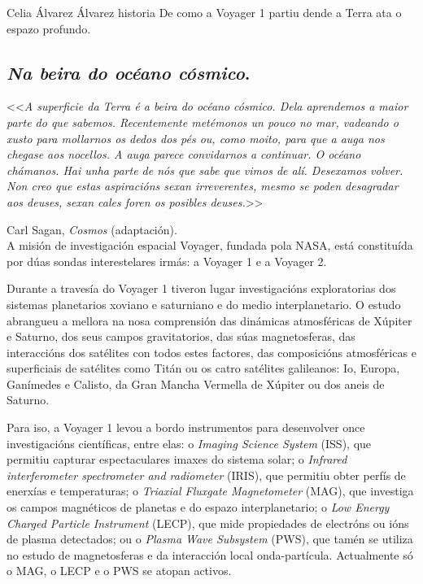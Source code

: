\Titular*%
{Viaxeiros espaciais. Oda á Voyager 1}%
{Celia Álvarez Álvarez}%
{historia}%
{De como a Voyager 1 partiu dende a Terra ata o espazo profundo.}%

\begin{refsection}
\begin{multicols}{2}

\subsection*{\textit{Na beira do océano cósmico}.}

<<\textit{A superficie da Terra é a beira do océano cósmico. Dela aprendemos a
maior parte do que sabemos. Recentemente metémonos un pouco no mar, vadeando o
xusto para mollarnos os dedos dos pés ou, como moito, para que a auga nos
chegase aos nocellos. A auga parece convidarnos a continuar. O océano chámanos.
Hai unha parte de nós que sabe que vimos de alí. Desexamos volver. Non creo que
estas aspiracións sexan irreverentes, mesmo se poden desagradar aos deuses,
sexan cales foren os posibles deuses.}>> 

\hfill Carl Sagan, \textit{Cosmos} (adaptación). \\

A misión de investigación espacial Voyager, fundada pola NASA, está constituída
por dúas sondas interestelares irmás: a Voyager 1 e a Voyager 2.

Durante a travesía do Voyager 1 tiveron lugar investigacións exploratorias dos
sistemas planetarios xoviano e saturniano e do medio interplanetario. O estudo
abrangueu a mellora na nosa comprensión das dinámicas atmosféricas de Xúpiter e
Saturno, dos seus campos gravitatorios, das súas magnetosferas, das
interaccións dos satélites con todos estes factores, das composicións
atmosféricas e superficiais de satélites como Titán ou os catro satélites
galileanos: Io, Europa, Ganímedes e Calisto, da Gran Mancha Vermella de Xúpiter
ou dos aneis de Saturno.

Para iso, a Voyager 1 levou a bordo instrumentos para desenvolver once
investigacións científicas, entre elas: o \textit{Imaging Science System}
(ISS), que permitiu capturar espectaculares imaxes do sistema solar; o
\textit{Infrared interferometer spectrometer and radiometer} (IRIS), que
permitiu obter perfís de enerxías e temperaturas; o \textit{Triaxial Fluxgate
Magnetometer} (MAG), que investiga os campos magnéticos de planetas e do espazo
interplanetario; o \textit{Low Energy Charged Particle Instrument} (LECP), que
mide propiedades de electróns ou ións de plasma detectados; ou o \textit{Plasma
Wave Subsystem} (PWS), que tamén se utiliza no estudo de magnetosferas e da
interacción local onda-partícula. Actualmente só o MAG, o LECP e o PWS se
atopan activos.


\end{multicols}
\end{refsection}

